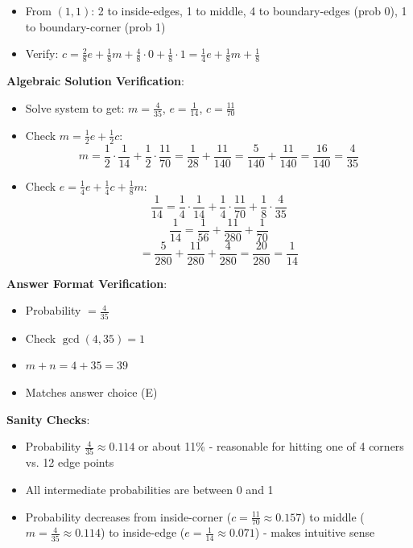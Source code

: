 \documentclass[12pt]{article}
\begin{document}
\begin{verificationbox}
\begin{itemize}[leftmargin=*]
    \item From $(1,1)$: 2 to inside-edges, 1 to middle, 4 to boundary-edges (prob 0), 1 to boundary-corner (prob 1)
    \item Verify: $c = \frac{2}{8}e + \frac{1}{8}m + \frac{4}{8} \cdot 0 + \frac{1}{8} \cdot 1 = \frac{1}{4}e + \frac{1}{8}m + \frac{1}{8}$ \checkmark
\end{itemize}

\textbf{Algebraic Solution Verification}:
\begin{itemize}[leftmargin=*]
    \item Solve system to get: $m = \frac{4}{35}$, $e = \frac{1}{14}$, $c = \frac{11}{70}$
    
    \item Check $m = \frac{1}{2}e + \frac{1}{2}c$: 
    \[m = \frac{1}{2} \cdot \frac{1}{14} + \frac{1}{2} \cdot \frac{11}{70} = \frac{1}{28} + \frac{11}{140} = \frac{5}{140} + \frac{11}{140} = \frac{16}{140} = \frac{4}{35}\] \checkmark
    
    \item Check $e = \frac{1}{4}e + \frac{1}{4}c + \frac{1}{8}m$:
    \[\frac{1}{14} = \frac{1}{4} \cdot \frac{1}{14} + \frac{1}{4} \cdot \frac{11}{70} + \frac{1}{8} \cdot \frac{4}{35}\]
    \[\frac{1}{14} = \frac{1}{56} + \frac{11}{280} + \frac{1}{70}\]
    \[= \frac{5}{280} + \frac{11}{280} + \frac{4}{280} = \frac{20}{280} = \frac{1}{14}\] \checkmark
\end{itemize}

\textbf{Answer Format Verification}:
\begin{itemize}[leftmargin=*]
    \item Probability $= \frac{4}{35}$
    \item Check $\gcd(4, 35) = 1$ \checkmark
    \item $m + n = 4 + 35 = 39$ \checkmark
    \item Matches answer choice (E) \checkmark
\end{itemize}

\textbf{Sanity Checks}:
\begin{itemize}[leftmargin=*]
    \item Probability $\frac{4}{35} \approx 0.114$ or about 11\% - reasonable for hitting one of 4 corners vs. 12 edge points
    \item All intermediate probabilities are between 0 and 1 \checkmark
    \item Probability decreases from inside-corner ($c = \frac{11}{70} \approx 0.157$) to middle ($m = \frac{4}{35} \approx 0.114$) to inside-edge ($e = \frac{1}{14} \approx 0.071$) - makes intuitive sense \checkmark
\end{itemize}


\end{verificationbox}
\end{document}
